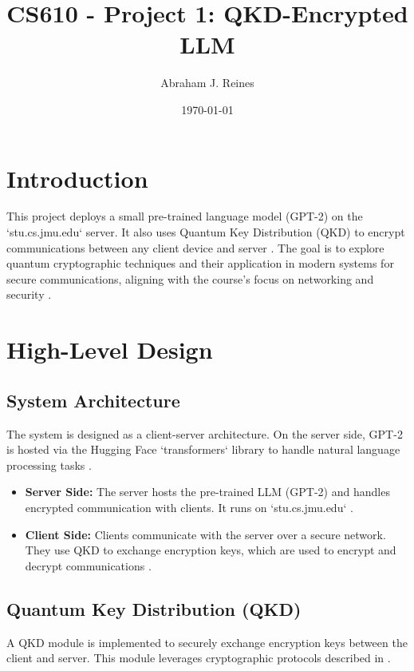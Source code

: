 \documentclass{article}
\title{CS610 - Project 1: QKD-Encrypted LLM}
\author{Abraham J. Reines}
\date{\today}
\begin{document}
\maketitle

\tableofcontents

\section{Introduction}
This project deploys a small pre-trained language model (GPT-2) on the `stu.cs.jmu.edu` server. It also uses Quantum Key Distribution (QKD) to encrypt communications between any client device and server \parencite{yin2017, patel2020}. The goal is to explore quantum cryptographic techniques and their application in modern systems for secure communications, aligning with the course's focus on networking and security \parencite{tanenbaum2020}.

\section{High-Level Design}

\subsection{System Architecture}
The system is designed as a client-server architecture. On the server side, GPT-2 is hosted via the Hugging Face `transformers` library to handle natural language processing tasks \parencite{huggingface_gpt2_2024, jalammar_gpt2_illustration_2024}. 
\begin{itemize}
    \item \textbf{Server Side:} The server hosts the pre-trained LLM (GPT-2) and handles encrypted communication with clients. It runs on `stu.cs.jmu.edu` \parencite{lo2012}.
    \item \textbf{Client Side:} Clients communicate with the server over a secure network. They use QKD to exchange encryption keys, which are used to encrypt and decrypt communications \parencite{scarani2014, patel2020}.
\end{itemize}

\subsection{Quantum Key Distribution (QKD)}
A QKD module is implemented to securely exchange encryption keys between the client and server. This module leverages cryptographic protocols described in \parencite{bennett1984, lo2012, scarani2014, nsa2024}.
\end{document}
